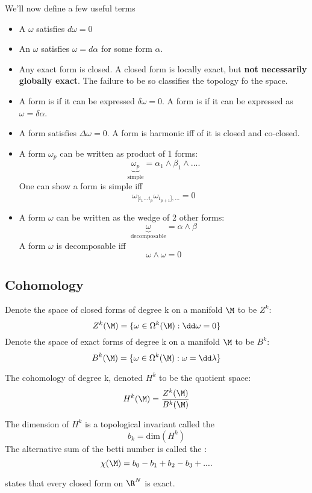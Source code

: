 \documentclass[11pt]{scrartcl}
\begin{document}
We'll now define a few useful terms
\begin{itemize}
	\item A  $\omega$ satisfies
	$ d \omega = 0$
	\item An  $\omega$ satisfies
	$ \omega = d \alpha$ for some form $\alpha$.
	\item Any exact form is closed.    A closed form is locally exact, but \textbf{not necessarily globally exact}.  The failure to be so classifies the topology fo the space.
	\item A form is  if it can be expressed
	$\delta \omega = 0$.  A form is  if it can be expressed as $\omega = \delta \alpha$.
	\item A  form satisfies $\Delta \omega = 0$.  A form is harmonic iff of it is closed and co-closed.
	\item A  form $\omega_p$ can be written as product of 1 forms:
	$$\underbrace{\omega_p}_{\text{simple}} = \alpha_1 \wedge \beta_1 \wedge....$$
	One can show a form is simple iff
	$$\omega_{[i_1...i_p} \omega_{i_{p+1}], ...} = 0$$
	\item A  form $\omega$ can be written as the wedge of 2 other forms:
	$$ \underbrace{ \omega}_{\text{decomposable}} = \alpha \wedge \beta$$
	A form $\omega$ is decomposable iff
	$$ \omega \wedge \omega = 0$$
\end{itemize}

\subsection{Cohomology}

Denote the space of closed forms of degree k on a manifold $\M$ to be $Z^k$:
\[Z^k(\M) = \{\omega \in \Omega^{k}(\M): \dd \omega = 0 \}  \]
Denote the space of exact forms of degree k on a manifold $\M$ to be $B^k$:
\[B^k(\M) = \{\omega \in \Omega^{k}(\M): \omega = \dd \lambda \} \]

The cohomology of degree k, denoted $H^k$ to be the quotient space:
\[H^k (\M) = {Z^k(\M) \over B^k(\M)}\]

The dimension of $H^k$ is a topological invariant called the 
\[b_k = \text{dim}(H^k)\]
The alternative sum of the betti number is called the :
\[ \chi(\M) = b_0 - b_1 + b_2 - b_3 +.... \]
\begin{lemma}
	 states that every closed form on $\R^N$ is exact.
\end{lemma}
\end{document}
